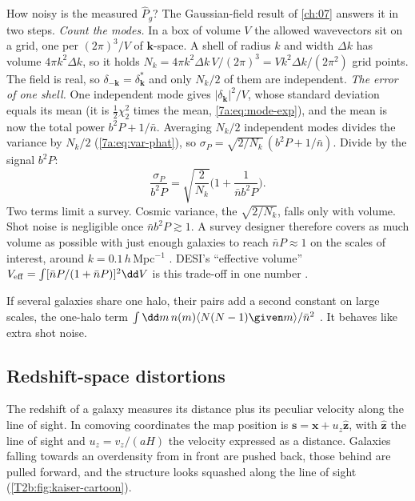 How noisy is the measured $\hat P_g$? The Gaussian-field result of \cref{ch:07} answers it in two steps. \emph{Count the modes.} In a box of volume $V$ the allowed wavevectors sit on a grid, one per $(2\pi)^3/V$ of $\bm k$-space. A shell of radius $k$ and width $\Delta k$ has volume $4\pi k^2\Delta k$, so it holds $N_k=4\pi k^2\Delta k\,V/(2\pi)^3=Vk^2\Delta k/(2\pi^2)$ grid points. The field is real, so $\delta_{-\bm k}=\delta_{\bm k}^*$ and only $N_k/2$ of them are independent. \emph{The error of one shell.} One independent mode gives $|\delta_{\bm k}|^2/V$, whose standard deviation equals its mean (it is $\frac12\chi^2_2$ times the mean, \eqref{7a:eq:mode-exp}), and the mean is now the total power $b^2P+1/\bar n$. Averaging $N_k/2$ independent modes divides the variance by $N_k/2$ (\eqref{7a:eq:var-phat}), so $\sigma_P=\sqrt{2/N_k}\,(b^2P+1/\bar n)$. Divide by the signal $b^2P$:
\begin{equation}
  \frac{\sigma_{P}}{b^2P}=\sqrt{\frac{2}{N_k}}\Big(1+\frac{1}{\bar nb^2P}\Big).
  \label{T2b:eq:pk-error}
\end{equation}
Two terms limit a survey. Cosmic variance, the $\sqrt{2/N_k}$, falls only with volume. Shot noise is negligible once $\bar nb^2P\gtrsim1$. A survey designer therefore covers as much volume as possible with just enough galaxies to reach $\bar nP\approx1$ on the scales of interest, around $k=0.1\,h$\,Mpc$^{-1}$ \cite[Sec.~4.4.5]{Weinberg2013}. DESI's ``effective volume'' $V_{\rm eff}=\int[\bar nP/(1+\bar nP)]^2\dd V$ is this trade-off in one number \cite[Table~1]{DESI2024VI}.

If several galaxies share one halo, their pairs add a second constant on large scales, the one-halo term $\int\dd m\,n(m)\langle N(N-1)\given m\rangle/\bar n^2$ \cite[eq.~(128)]{CooraySheth2002}. It behaves like extra shot noise.

\subsection{Redshift-space distortions}

The redshift of a galaxy measures its distance plus its peculiar velocity along the line of sight. In comoving coordinates the map position is $\bm s=\bm x+u_z\hat{\bm z}$, with $\hat{\bm z}$ the line of sight and $u_z=v_z/(aH)$ the velocity expressed as a distance. Galaxies falling towards an overdensity from in front are pushed back, those behind are pulled forward, and the structure looks squashed along the line of sight (\cref{T2b:fig:kaiser-cartoon}).

